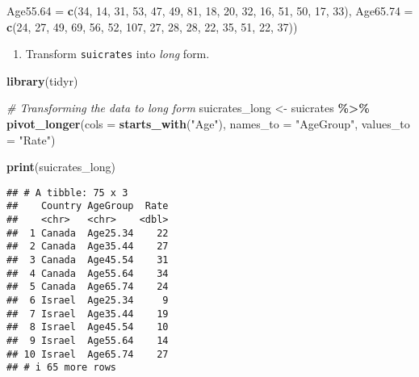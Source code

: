 \documentclass[
]{article}
\newenvironment{Shaded}{\begin{snugshade}}{\end{snugshade}}
\newcommand{\AttributeTok}[1]{\textcolor[rgb]{0.13,0.29,0.53}{#1}}
\newcommand{\CommentTok}[1]{\textcolor[rgb]{0.56,0.35,0.01}{\textit{#1}}}
\newcommand{\DecValTok}[1]{\textcolor[rgb]{0.00,0.00,0.81}{#1}}
\newcommand{\FunctionTok}[1]{\textcolor[rgb]{0.13,0.29,0.53}{\textbf{#1}}}
\newcommand{\NormalTok}[1]{#1}
\newcommand{\OtherTok}[1]{\textcolor[rgb]{0.56,0.35,0.01}{#1}}
\newcommand{\SpecialCharTok}[1]{\textcolor[rgb]{0.81,0.36,0.00}{\textbf{#1}}}
\newcommand{\StringTok}[1]{\textcolor[rgb]{0.31,0.60,0.02}{#1}}
\providecommand{\tightlist}{%
  \setlength{\itemsep}{0pt}\setlength{\parskip}{0pt}}
\begin{document}
\begin{Shaded}
\begin{Highlighting}[]
 \AttributeTok{Age55.64 =} \FunctionTok{c}\NormalTok{(}\DecValTok{34}\NormalTok{, }\DecValTok{14}\NormalTok{, }\DecValTok{31}\NormalTok{, }\DecValTok{53}\NormalTok{, }\DecValTok{47}\NormalTok{, }\DecValTok{49}\NormalTok{, }\DecValTok{81}\NormalTok{, }\DecValTok{18}\NormalTok{, }\DecValTok{20}\NormalTok{, }\DecValTok{32}\NormalTok{, }\DecValTok{16}\NormalTok{, }\DecValTok{51}\NormalTok{, }\DecValTok{50}\NormalTok{, }\DecValTok{17}\NormalTok{, }\DecValTok{33}\NormalTok{),}
 \AttributeTok{Age65.74 =} \FunctionTok{c}\NormalTok{(}\DecValTok{24}\NormalTok{, }\DecValTok{27}\NormalTok{, }\DecValTok{49}\NormalTok{, }\DecValTok{69}\NormalTok{, }\DecValTok{56}\NormalTok{, }\DecValTok{52}\NormalTok{, }\DecValTok{107}\NormalTok{, }\DecValTok{27}\NormalTok{, }\DecValTok{28}\NormalTok{, }\DecValTok{28}\NormalTok{, }\DecValTok{22}\NormalTok{, }\DecValTok{35}\NormalTok{, }\DecValTok{51}\NormalTok{, }\DecValTok{22}\NormalTok{, }\DecValTok{37}\NormalTok{))}
\end{Highlighting}
\end{Shaded}

\begin{enumerate}
\def\labelenumi{\alph{enumi}.}
\tightlist
\item
  Transform \texttt{suicrates} into \emph{long} form.
\end{enumerate}

\begin{Shaded}
\begin{Highlighting}[]
\FunctionTok{library}\NormalTok{(tidyr)}

\CommentTok{\# Transforming the data to long form}
\NormalTok{suicrates\_long }\OtherTok{\textless{}{-}}\NormalTok{ suicrates }\SpecialCharTok{\%\textgreater{}\%}
  \FunctionTok{pivot\_longer}\NormalTok{(}\AttributeTok{cols =} \FunctionTok{starts\_with}\NormalTok{(}\StringTok{"Age"}\NormalTok{), }\AttributeTok{names\_to =} \StringTok{"AgeGroup"}\NormalTok{, }\AttributeTok{values\_to =} \StringTok{"Rate"}\NormalTok{)}

\FunctionTok{print}\NormalTok{(suicrates\_long)}
\end{Highlighting}
\end{Shaded}

\begin{verbatim}
## # A tibble: 75 x 3
##    Country AgeGroup  Rate
##    <chr>   <chr>    <dbl>
##  1 Canada  Age25.34    22
##  2 Canada  Age35.44    27
##  3 Canada  Age45.54    31
##  4 Canada  Age55.64    34
##  5 Canada  Age65.74    24
##  6 Israel  Age25.34     9
##  7 Israel  Age35.44    19
##  8 Israel  Age45.54    10
##  9 Israel  Age55.64    14
## 10 Israel  Age65.74    27
## # i 65 more rows
\end{verbatim}
\end{document}
